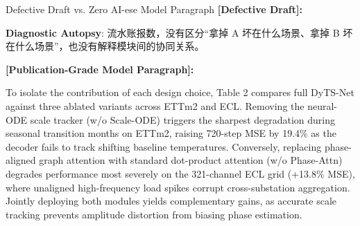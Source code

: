 \begin{ExampleBox}{Defective Draft vs. Zero AI-ese Model Paragraph}
\textbf{\color{TargetHighlight}[Defective Draft]:}\par
{}\par\vspace{4pt}
\textbf{Diagnostic Autopsy}: 流水账报数，没有区分“拿掉 A 坏在什么场景、拿掉 B 坏在什么场景”，也没有解释模块间的协同关系。\par\vspace{6pt}
\textbf{\color{AcadNavy}[Publication-Grade Model Paragraph]:}\par
To isolate the contribution of each design choice, Table 2 compares full DyTS-Net against three ablated variants across ETTm2 and ECL. Removing the neural-ODE scale tracker (w/o Scale-ODE) triggers the sharpest degradation during seasonal transition months on ETTm2, raising 720-step MSE by 19.4\% as the decoder fails to track shifting baseline temperatures. Conversely, replacing phase-aligned graph attention with standard dot-product attention (w/o Phase-Attn) degrades performance most severely on the 321-channel ECL grid (+13.8\% MSE), where unaligned high-frequency load spikes corrupt cross-substation aggregation. Jointly deploying both modules yields complementary gains, as accurate scale tracking prevents amplitude distortion from biasing phase estimation.
\end{ExampleBox}
